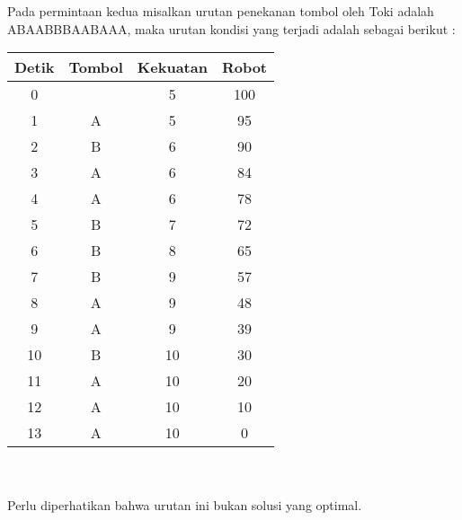 \documentclass{article}
\begin{document}
\pagebreak
Pada permintaan kedua misalkan urutan penekanan tombol oleh Toki adalah ABAABBBAABAAA, maka urutan kondisi yang terjadi adalah sebagai berikut : \\
\begin{tabular}{ | c | c | c | c | }
    \hline
    Detik & Tombol & Kekuatan & Robot \\ 
    \hline
    0 &  & 5 & 100\\  
    \hline
    1 & A & 5 & 95\\  
    \hline
    2 & B & 6 & 90\\  
    \hline
    3 & A & 6 & 84\\  
    \hline
    4 & A & 6 & 78\\  
    \hline
    5 & B & 7 & 72\\  
    \hline
    6 & B & 8 & 65\\  
    \hline
    7 & B & 9 & 57\\  
    \hline
    8 & A & 9 & 48\\  
    \hline
    9 & A & 9 & 39\\  
    \hline
    10 & B & 10 & 30\\  
    \hline
    11 & A & 10 & 20\\  
    \hline
    12 & A & 10 & 10\\  
    \hline
    13 & A & 10 & 0\\  
    \hline
\end{tabular}
\\
\\
Perlu diperhatikan bahwa urutan ini bukan solusi yang optimal.

\pagebreak
\end{document}
